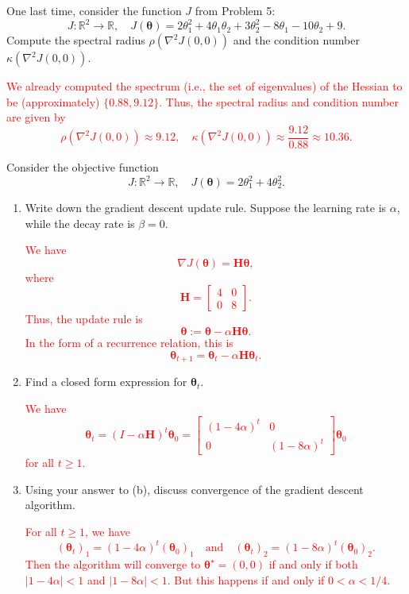 \documentclass[12pt,reqno]{amsart}
\begin{document}
\prob One last time, consider the function $J$ from Problem 5:
	\[J: \mathbb{R}^2 \to \mathbb{R}, \quad J(\boldsymbol{\theta}) = 2\theta_1^2 + 4\theta_1\theta_2 + 3\theta_2^2 -8\theta_1 - 10\theta_2 + 9.
	\]
Compute the spectral radius $\rho\left(\nabla^2J(0,0)\right)$ and the condition number $\kappa\left(\nabla^2 J(0,0)\right)$.

\bigskip
\textcolor{red}{We already computed the spectrum (i.e., the set of eigenvalues) of the Hessian to be (approximately) $\{0.88, 9.12\}$. Thus, the spectral radius and condition number are given by
	\[\rho\left(\nabla^2J(0,0)\right) \approx 9.12, \quad \kappa\left(\nabla^2 J(0,0)\right) \approx \frac{9.12}{0.88} \approx 10.36.
	\]}
\bigskip








\prob Consider the objective function
	\[J:\mathbb{R}^2 \to \mathbb{R}, \quad J(\boldsymbol{\theta}) = 2\theta_1^2 + 4\theta_2^2.
	\]


\begin{enumerate}
\item Write down the gradient descent update rule. Suppose the learning rate is $\alpha$, while the decay rate is $\beta=0$.

\bigskip
\textcolor{red}{We have
	\[ \nabla J(\boldsymbol{\theta}) = \mathbf{H} \boldsymbol{\theta},
	\]
where
	\[\mathbf{H} = \begin{bmatrix}
	4 & 0 \\ 0 & 8
	\end{bmatrix}.
	\]
Thus, the update rule is
	\[\boldsymbol{\theta} := \boldsymbol{\theta} - \alpha \mathbf{H} \boldsymbol{\theta}.
	\]
In the form of a recurrence relation, this is
	\[\boldsymbol{\theta}_{t+1} = \boldsymbol{\theta}_t - \alpha \mathbf{H} \boldsymbol{\theta}_t.
	\]}
\bigskip

\item Find a closed form expression for $\boldsymbol{\theta}_t$.

\bigskip
\textcolor{red}{We have
	\[\boldsymbol{\theta}_t = (I-\alpha \mathbf{H})^t \boldsymbol{\theta}_0 = \begin{bmatrix}
	(1-4\alpha)^t & 0 \\ 0 & (1-8\alpha)^t
	\end{bmatrix} \boldsymbol{\theta}_0
	\]
for all $t\geq 1$.}
\bigskip

\item Using your answer to (b), discuss convergence of the gradient descent algorithm.

\bigskip
\textcolor{red}{For all $t\geq 1$, we have
	\[(\boldsymbol{\theta}_t)_1 = (1-4\alpha)^t (\boldsymbol{\theta}_0)_1 \quad \text{and} \quad (\boldsymbol{\theta}_t)_2 = (1-8\alpha)^t (\boldsymbol{\theta}_0)_2.
	\]
Then the algorithm will converge to $\boldsymbol{\theta}^\star = (0,0)$ if and only if both $|1-4\alpha|<1$ and $|1-8\alpha|<1$. But this happens if and only if $0 < \alpha < 1/4$.}
\bigskip
\end{enumerate}
\end{document}
